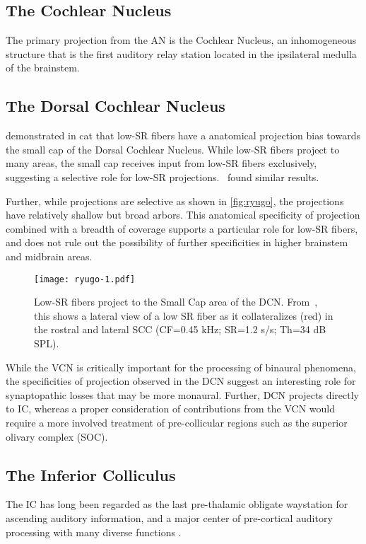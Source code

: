 \subsection{The Cochlear Nucleus} %
\label{sub:the_cochlear_nucleus}
The primary projection from the AN is the Cochlear Nucleus, an inhomogeneous structure that is the first auditory relay station located in the ipsilateral medulla of the brainstem.  
\subsection{The Dorsal Cochlear Nucleus} %
\label{sub:the_dorsal_cochlear_nucleus}
\cite{Ryugo2008Projections} demonstrated in cat that low-SR fibers have a anatomical projection bias towards the small cap of the Dorsal Cochlear Nucleus.  While low-SR fibers project to many areas, the small cap receives input from low-SR fibers exclusively, suggesting a selective role for low-SR projections.~\cite{Liberman1993Central} found similar results. 

Further, while projections are selective as shown in \autoref{fig:ryugo}, the projections have relatively shallow but broad arbors. This anatomical specificity of projection combined with a breadth of coverage supports a particular role for low-SR fibers, and does not rule out the possibility of further specificities in higher brainstem and midbrain areas. 

\begin{figure}[htbp]
	\centering
	\texttt{[image: ryugo-1.pdf]}
	\caption[Low SR Fibers Project to the Small Cap]{Low-SR fibers project to the Small Cap area of the DCN.  From~\cite{Ryugo2008Projections}, this shows a lateral view of a low SR fiber as it collateralizes (red) in the rostral and lateral SCC (CF=0.45 kHz; SR=1.2 s/s; Th=34 dB SPL).}
	\label{fig:ryugo}
\end{figure}

While the VCN is critically important for the processing of binaural phenomena, the specificities of projection observed in the DCN suggest an interesting role for synaptopathic losses that may be more monaural.  Further, DCN projects directly to IC, whereas a proper consideration of contributions from the VCN would require a more involved treatment of pre-collicular regions such as the superior olivary complex (SOC). 
\subsection{The Inferior Colliculus} %
\label{sub:the_inferior_colliculus}
The IC has long been regarded as the last pre-thalamic obligate waystation for ascending auditory information, and a major center of pre-cortical auditory processing with many diverse functions \citep{Cant2005Atlas,Covey2008Inputs,Moore1985Projections}.

